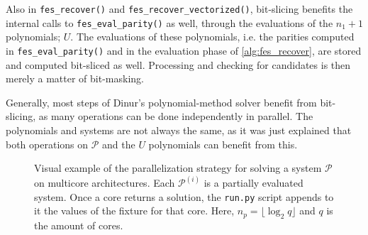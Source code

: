 Also in \texttt{fes\_recover()} and \texttt{fes\_recover\_vectorized()}, bit-slicing benefits the internal calls to \texttt{fes\_eval\_parity()} as well, through the evaluations of the $n_1 + 1$ polynomials; $U$. The evaluations of these polynomials, i.e. the parities computed in \texttt{fes\_eval\_parity()} and in the evaluation phase of \cref{alg:fes_recover}, are stored and computed bit-sliced as well. Processing and checking for candidates is then merely a matter of bit-masking. 

Generally, most steps of Dinur's polynomial-method solver benefit from bit-slicing, as many operations can be done independently in parallel. The polynomials and systems are not always the same, as it was just explained that both operations on $\mathcal{P}$ and the $U$ polynomials can benefit from this.

\begin{figure}[t]
    \centering
    \caption{Visual example of the parallelization strategy for solving a system $\mathcal{P}$ on multicore architectures. Each $\mathcal{P}^{(i)}$ is a partially evaluated system. Once a core returns a solution, the \texttt{run.py} script appends to it the values of the fixture for that core. Here, $n_{p} = \lfloor \log_2 q \rfloor$ and $q$ is the amount of cores.} \label{fig:multicore_visual}
\end{figure}


